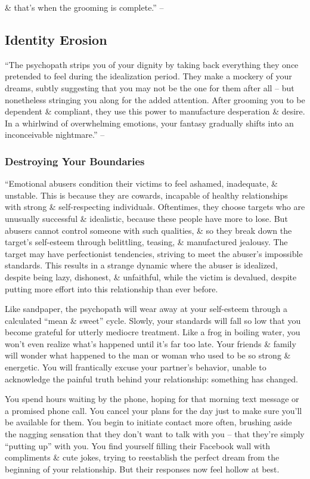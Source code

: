 \documentclass{article}
\numberwithin{equation}{section}
\begin{document}
\& that's when the grooming is complete.'' -- \cite[pp. 35--36]{MacKenzie2015}

\subsection{Identity Erosion}
``The psychopath strips you of your dignity by taking back everything they once pretended to feel during the idealization period. They make a mockery of your dreams, subtly suggesting that you may not be the one for them after all -- but nonetheless stringing you along for the added attention. After grooming you to be dependent \& compliant, they use this power to manufacture desperation \& desire. In a whirlwind of overwhelming emotions, your fantasy gradually shifts into an inconceivable nightmare.'' -- \cite[p. 37]{MacKenzie2015}

\subsubsection{Destroying Your Boundaries}
``Emotional abusers condition their victims to feel ashamed, inadequate, \& unstable. This is because they are cowards, incapable of healthy relationships with strong \& self-respecting individuals. Oftentimes, they choose targets who are unusually successful \& idealistic, because these people have more to lose. But abusers cannot control someone with such qualities, \& so they break down the target's self-esteem through belittling, teasing, \& manufactured jealousy. The target may have perfectionist tendencies, striving to meet the abuser's impossible standards. This results in a strange dynamic where the abuser is idealized, despite being lazy, dishonest, \& unfaithful, while the victim is devalued, despite putting more effort into this relationship than ever before.

Like sandpaper, the psychopath will wear away at your self-esteem through a calculated ``mean \& sweet'' cycle. Slowly, your standards will fall so low that you become grateful for utterly mediocre treatment. Like a frog in boiling water, you won't even realize what's happened until it's far too late. Your friends \& family will wonder what happened to the man or woman who used to be so strong \& energetic. You will frantically excuse your partner's behavior, unable to acknowledge the painful truth behind your relationship: something has changed.

You spend hours waiting by the phone, hoping for that morning text message or a promised phone call. You cancel your plans for the day just to make sure you'll be available for them. You begin to initiate contact more often, brushing aside the nagging sensation that they don't want to talk with you -- that they're simply ``putting up'' with you. You find yourself filling their Facebook wall with compliments \& cute jokes, trying to reestablish the perfect dream from the beginning of your relationship. But their responses now feel hollow at best.
\end{document}
